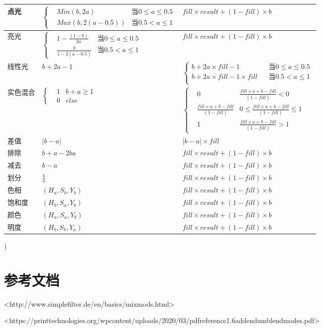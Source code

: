 \begin{table}[htbp]
\begin{tabular}{|l|l|l|}
	\hline
	点光&$\left\{ \begin{aligned}&Min(b,2a)& \text{当}0\leq a \leq 0.5\\&Max(b,2(a-0.5))&\text{当} 0.5< a \leq 1  \end{aligned}\right.$  & $fill\times result+(1-fill)\times b$    \\
	\hline
	亮光&$\left\{ \begin{aligned}&1-\frac{(1-b)}{2a}&\text{当} 0\leq a \leq 0.5\\&\frac{b}{1-2(a-0.5)}&\text{当} 0.5< a \leq 1\end{aligned}\right.$  &$fill\times result+(1-fill)\times b$    \\
	\hline
	线性光&  $b+2a-1$&$\left\{\begin{aligned}b+2a\times fill-1&&\text{当} 0\leq a \leq 0.5\\b+2a\times fill-1\times fill&&\text{当} 0.5< a \leq 1\\\end{aligned}\right.$    \\
	\hline
	实色混合& $\left\{ \begin{aligned}&1&b+a\geq 1\\&0&else  \end{aligned}\right.$ &  $\left\{ \begin{aligned}&0&  \frac{fill\times a+b-fill}{(1-fill)}<0\\ &\frac{fill\times a+b-fill}{(1-fill)}&0\leq \frac{fill\times a+b-fill}{(1-fill)}\leq 1\\ &1&  \frac{fill\times a+b-fill}{(1-fill)}>1 \end{aligned}\right.$  \\
	\hline
	差值& $|b-a|$ &$|b-a|\times fill$    \\
	\hline
	排除&  $b+a-2ba$&$fill\times result+(1-fill)\times b$     \\
	\hline
	减去& $b-a$ & $fill\times result+(1-fill)\times b$    \\
	\hline
	划分& $\frac{b}{a}$ &$fill\times result+(1-fill)\times b$     \\
	\hline
	色相&  $(H_a,S_b,Y_b) $&$fill\times result+(1-fill)\times b$     \\
	\hline
	饱和度&  $(H_b,S_a,Y_b)$& $fill\times result+(1-fill)\times b$    \\
	\hline
	颜色& $(H_a,S_a,Y_b)$ &  $fill\times result+(1-fill)\times b$   \\
	\hline
	明度& $(H_b,S_b,Y_a)$ &  $fill\times result+(1-fill)\times b$   \\
	\hline
\end{tabular}
\end{table})
\chapter{参考文档}

<http://www.simplefilter.de/en/basics/mixmods.html>

<https://printtechnologies.org/wpcontent/uploads/2020/03/pdfreference1.6addendumblendmodes.pdf>
